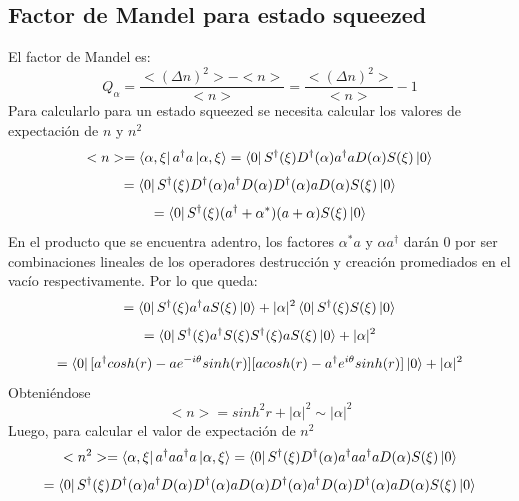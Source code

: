 \documentclass{book}
\begin{document}
   \subsection{Factor de Mandel para estado squeezed} El factor de Mandel es: 
   \begin{equation}{ Q_\alpha=\frac{<(\Delta n)^2>-<n>}{<n>}=\frac{<(\Delta n)^2>}{<n>}-1} \end{equation} Para calcularlo para un estado squeezed se necesita calcular los valores de expectación de ${n}$ y ${n^2}$
   \begin{equation}{<n>=\bra{\alpha,\xi}a^\dag a \ket{\alpha,\xi}=\bra{0}S^\dag(\xi)D^\dag(\alpha)a^\dag aD(\alpha)S(\xi) \ket{0}} \end{equation}
   \begin{equation}{=\bra{0}S^\dag(\xi)D^\dag(\alpha)a^\dag D(\alpha)D^\dag(\alpha)aD(\alpha)S(\xi) \ket{0}} \end{equation}
   \begin{equation}{=\bra{0}S^\dag(\xi)(a^\dag+\alpha^*)(a+\alpha)S(\xi) \ket{0}}\end{equation}
   En el producto que se encuentra adentro, los factores ${\alpha^*a}$ y $\alpha a^\dag$ darán 0 por ser combinaciones lineales de los operadores destrucción y creación promediados en el vacío respectivamente. Por lo que queda:
   \begin{equation}{=\bra{0}S^\dag(\xi)a^\dag aS(\xi) \ket{0}
   +\lvert\alpha\rvert^2\bra{0}S^\dag(\xi)S(\xi) \ket{0}}\end{equation}
    \begin{equation}{=\bra{0}S^\dag(\xi)a^\dag S(\xi)S^\dag(\xi) aS(\xi) \ket{0}+
   \lvert\alpha\rvert^2}\end{equation}
      \begin{equation}{=\bra{0}[a^\dag cosh(r)-ae^{-i\theta}sinh(r)][acosh(r)-a^\dag e^{i\theta}sinh(r)]\ket{0}+
   \lvert\alpha\rvert^2} \end{equation}  Obteniéndose    \begin{equation}{ <n>=sinh^2 r+\lvert\alpha\rvert^2\sim \lvert\alpha\rvert^2} \end{equation}
   Luego, para calcular el valor de expectación de ${n^2}$
   \begin{equation}{<n^2>=\bra{\alpha,\xi}a^\dag a a^\dag a\ket{\alpha,\xi}=\bra{0}S^\dag(\xi)D^\dag(\alpha)a^\dag a a^\dag aD(\alpha)S(\xi) \ket{0} }\end{equation} \begin{equation}{=\bra{0}S^\dag(\xi)D^\dag(\alpha)a^\dag D(\alpha)D^\dag(\alpha)aD(\alpha)D^\dag(\alpha)a^\dag D(\alpha)D^\dag(\alpha)aD(\alpha)S(\xi) \ket{0}} \end{equation}
\end{document}
